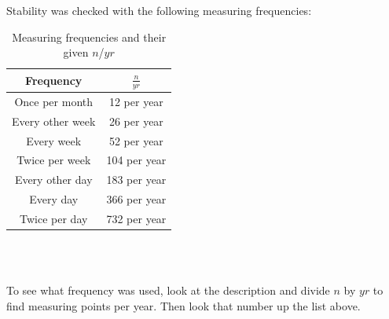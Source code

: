\documentclass{article}
\begin{document}
    Stability was checked with the following measuring frequencies:

        \begin{table}[H]
            \centering
            \caption{Measuring frequencies and their given $n$/$yr$}
            \vspace{2mm}
            \label{tab:frequencies}
            \begin{tabular}{|c|c|}
                \hline
                Frequency & $\frac{n}{yr}$ \\
                \hline \hline
                Once per month & 12 per year \\
                Every other week & 26 per year \\
                Every week & 52 per year \\
                Twice per week & 104 per year \\
                Every other day & 183 per year \\
                Every day  & 366 per year \\
                Twice per day & 732 per year \\
                \hline
            \end{tabular} \\
            \hspace{0pt}\\
        \end{table}

        To see what frequency was used, look at the description and divide $n$ by $yr$ to find measuring points per year. Then look that number up the list above.




\end{document}
